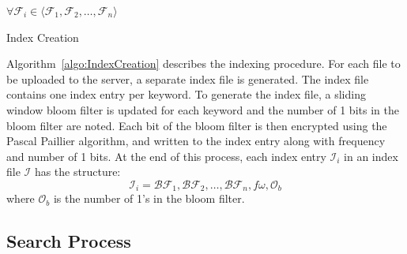 \begin{algorithm}
$ \forall \mathcal{F}_i \in \langle \mathcal{F}_1, \mathcal{F}_2, \ldots,
\mathcal{F}_n \rangle$\;
\;
 \caption{Index Creation}
 \label{algo:IndexCreation}
\end{algorithm}

Algorithm~\ref{algo:IndexCreation} describes the indexing procedure.
For each file to be uploaded to the server, a separate index file is generated. The index
file contains one index entry per keyword. To generate the index file, a sliding window bloom
filter is updated for each keyword and the number of 1 bits in the bloom filter are noted.
Each bit of the bloom filter is then encrypted using the Pascal Paillier algorithm, and written to 
the index entry along with frequency and number of 1 bits.
At the end of this process, each index entry $\mathcal{I}_i$ in an index file $\mathcal{I}$ has
the structure: 
\begin{equation}
\mathcal{I}_i = \mathcal{BF}_1,\mathcal{BF}_2, \ldots ,\mathcal{BF}_n, f\omega,
\mathcal{O}_b
  \label{eq: indexEntry}
\end{equation} 
where $\mathcal{O}_b$ is the number of 1's in the bloom filter.

\subsection{Search Process}

